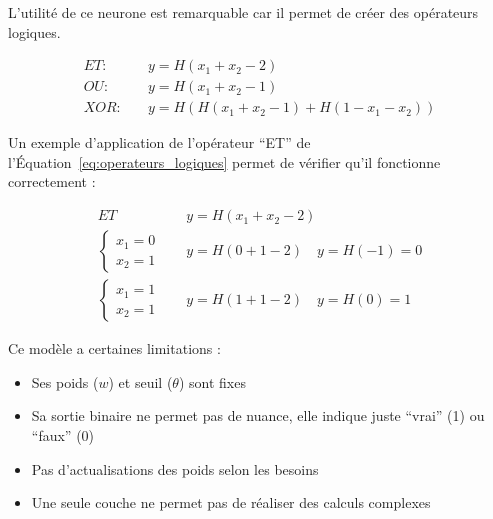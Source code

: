 \par{L'utilité de ce neurone est remarquable car il permet de créer des opérateurs logiques.}

\begin{equation}
    \begin{aligned}
        ET: \quad & y = H(x_1 + x_2 - 2) \\
        OU: \quad & y = H(x_1 + x_2 - 1) \\
        XOR: \quad & y = H(H(x_1 + x_2 - 1) + H(1 - x_1 - x_2))
    \end{aligned}
    \label{eq:operateurs_logiques}
\end{equation}

\par{Un exemple d'application de l'opérateur ``ET'' de l'Équation~\ref{eq:operateurs_logiques} permet de vérifier qu'il fonctionne correctement :}

\begin{equation}
    \begin{aligned}
        ET \quad \quad \quad & y = H(x_1 + x_2 - 2) \\
        \begin{cases}
            x_1 = 0 \\
            x_2 = 1
        \end{cases} \quad & y = H(0 + 1 - 2) \quad y = H(-1) = 0 \\
        \begin{cases}
            x_1 = 1 \\
            x_2 = 1
        \end{cases} \quad & y = H(1 + 1 - 2) \quad y = H(0) = 1
    \end{aligned}
    \label{eq:exemple_ET}
\end{equation}

\par{Ce modèle a certaines limitations :}
\begin{itemize}
    \item Ses poids ($w$) et seuil ($\theta$) sont fixes
    \item Sa sortie binaire ne permet pas de nuance, elle indique juste ``vrai'' (1) ou ``faux'' (0)
    \item Pas d'actualisations des poids selon les besoins
    \item Une seule couche ne permet pas de réaliser des calculs complexes
\end{itemize}


